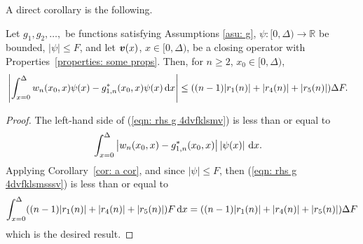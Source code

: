 A direct corollary is the following.
\begin{cor}\label{cor: asjdajaaaaa}
	 Let \(g_1,g_2,\dots,\) be functions satisfying Assumptions \ref{asu: g}, \(\psi:[0,\Delta) \to \mathbb R\) be bounded, \(|\psi|\leq F\), and let \({\boldsymbol v}(x)\), \(x\in[0,\Delta)\), be a closing operator with Properties~\ref{properties: some props}. Then, for \(n\geq 2\), \(x_0\in[0,\Delta)\), 
	\begin{align}
		&\left| \int_{x=0}^\Delta w_n(x_0,x) \psi(x)-g_{1,n}^*(x_0,x)\psi(x)\, \mathrm{d} x\right|  
		\leq ((n-1)|r_1(n)| + |r_4(n)| + |r_5(n)|)\Delta F. \label{eqn: rhs g 4dvfklsmv}
	\end{align}
\end{cor}
\begin{proof}
	The left-hand side of (\ref{eqn: rhs g 4dvfklsmv}) is less than or equal to 
	\begin{align}
		&\int_{x=0}^\Delta \left| w_n(x_0,x) 
		{}- g_{1,n}^*(x_0,x)\right| \left|\psi(x)\right| \, \mathrm{d} x. \label{eqn: rhs g 4dvfklsmsssv}
	\end{align}
	Applying Corollary~\ref{cor: a cor}, and since \(|\psi|\leq F\), then (\ref{eqn: rhs g 4dvfklsmsssv}) is less than or equal to 
	\begin{align}
		\int_{x=0}^\Delta((n-1)|r_1(n)| + |r_4(n)| + |r_5(n)|) F \, \mathrm{d} x \nonumber 
		= ((n-1)|r_1(n)| + |r_4(n)| + |r_5(n)|)\Delta F \nonumber
	\end{align}
	which is the desired result.
\end{proof}

